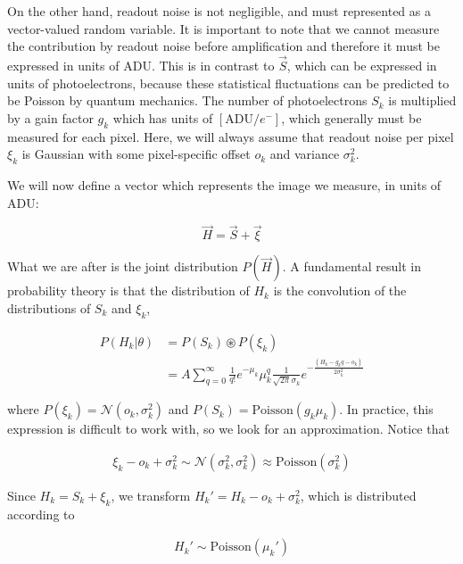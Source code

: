 \documentclass{ucetd}
\begin{document}
On the other hand, readout noise is not negligible, and must represented as a vector-valued random variable. It is important to note that we cannot measure the contribution by readout noise before amplification and therefore it must be expressed in units of $\mathrm{ADU}$. This is in contrast to $\vec{S}$, which can be expressed in units of photoelectrons, because these statistical fluctuations can be predicted to be Poisson by quantum mechanics. The number of photoelectrons $S_{k}$ is  multiplied by a gain factor $g_{k}$ which has units of $[\mathrm{ADU}/e^{-}]$, which generally must be measured for each pixel. Here, we will always assume that readout noise per pixel $\xi_{k}$ is Gaussian with some pixel-specific offset $o_{k}$ and variance $\sigma_{k}^{2}$. 

We will now define a vector which represents the image we measure, in units of ADU: 

\begin{equation}
\vec{H} = \vec{S} + \vec{\xi}
\end{equation}

What we are after is the joint distribution $P(\vec{H})$. A fundamental result in probability theory is that the distribution of $H_{k}$ is the convolution of the distributions of $S_{k}$ and $\xi_{k}$,

\begin{align}
P(H_{k}|\theta) &= P(S_{k})\circledast P(\xi_{k})\\
&= A\sum_{q=0}^{\infty} \frac{1}{q!}e^{-\mu_{k}}\mu_{k}^{q}\frac{1}{\sqrt{2\pi}\sigma_{k}}e^{-\frac{(H_{k}-g_{k}q-o_{k})}{2\sigma_{k}^{2}}}
\end{align}

where $P(\xi_{k}) = \mathcal{N}(o_{k},\sigma_{k}^{2})$ and $P(S_{k}) = \mathrm{Poisson}(g_{k}\mu_{k})$. In practice, this expression is difficult to work with, so we look for an approximation. Notice that 

\begin{align*}
\xi_{k} - o_{k} + \sigma_{k}^{2} \sim \mathcal{N}(\sigma_{k}^{2},\sigma_{k}^{2}) \approx \mathrm{Poisson}(\sigma_{k}^{2})
\end{align*}

Since $H_{k} = S_{k} + \xi_{k}$, we transform $H_{k}' = H_{k} - o_{k} + \sigma_{k}^{2}$, which is distributed according to 

\begin{align*}
H_{k}' \sim \mathrm{Poisson}(\mu_{k}')
\end{align*}
\end{document}
